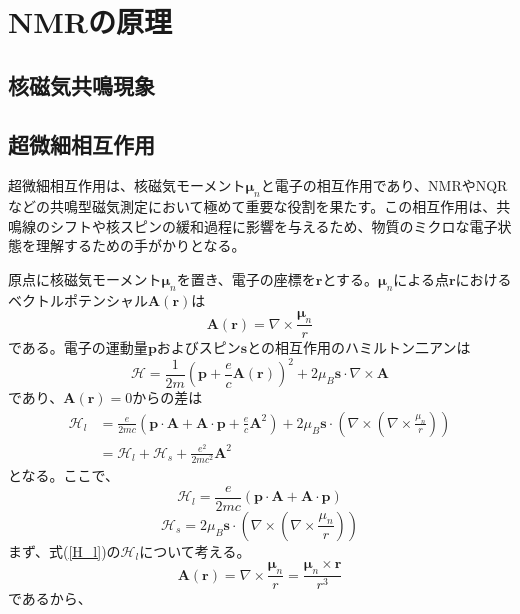 \documentclass[11pt,a4j]{jreport}
\begin{document}
\chapter{NMRの原理}
\section{核磁気共鳴現象}

\section{超微細相互作用}
超微細相互作用は、核磁気モーメント$\bm \mu_n$と電子の相互作用であり、NMRやNQRなどの共鳴型磁気測定において極めて重要な役割を果たす。この相互作用は、共鳴線のシフトや核スピンの緩和過程に影響を与えるため、物質のミクロな電子状態を理解するための手がかりとなる。\par
原点に核磁気モーメント$\bm \mu_n$を置き、電子の座標を$\bm r$とする。$\bm \mu_n$による点$\bm r$におけるベクトルポテンシャル$\bm A(\bm r)$は
\begin{equation}
  \bm A(\bm r)=\nabla\times \frac{\bm \mu_n}{r}
\end{equation}
である。電子の運動量$\bm p$およびスピン$\bm s$との相互作用のハミルトン二アンは
\begin{equation}
  \mathcal{H} = \frac{1}{2m}\left(\bm p + \frac{e}{c}\bm A(\bm r)\right)^2 + 2\mu_B \bm s\cdot\nabla\times\bm A
  \label{H}
\end{equation}
であり、$\bm A(\bm r)=0$からの差は
\begin{align} 
    \mathcal{H}_l&=\frac{e}{2mc}(\bm p\cdot \bm A+\bm A\cdot\bm p+\frac{e}{c}\bm A^2)+2\mu_B\bm s\cdot\left(\nabla\times\left(\nabla\times\frac{\mu_n}{r}\right)\right)\\
    &=\mathcal{H}_l+\mathcal{H}_s+\frac{e^2}{2mc^2}\bm A^2
\end{align}
となる。ここで、
\begin{equation}
  \mathcal{H}_l=\frac{e}{2mc}(\bm p\cdot\bm A + \bm A \cdot \bm p)
  \label{H_l}
\end{equation}
\begin{equation}
  \mathcal{H}_s=2\mu_B\bm s\cdot\left(\nabla\times\left(\nabla\times\frac{\mu_n}{r}\right)\right)
  \label{H_s}
\end{equation}
まず、式(\ref{H_l})の$\mathcal{H}_l$について考える。
\begin{equation}
  \bm A(\bm r)=\nabla\times\frac{\bm \mu_n}{r}=\frac{\bm \mu_n\times\bm r}{r^3}
\end{equation}
であるから、
\end{document}
